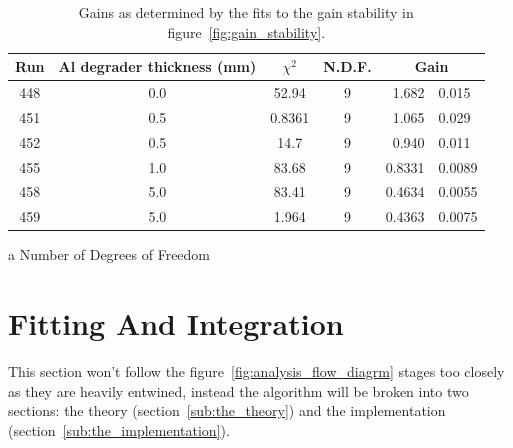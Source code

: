 \begin{table}
    \begin{center}
        \begin{threeparttable}
            \begin{tabular}{c|c|c|c|r@{ $\pm$ }l}
                Run & Al degrader thickness (mm) & $\chi^2$ 
                                                 & N.D.F. \tnote{a}
                                                 & \multicolumn{2}{|c}{Gain} \\
                \hline
                448  &  0.0  &  52.94   &  9  &  1.682  &  0.015  \\
                451  &  0.5  &  0.8361  &  9  &  1.065  &  0.029  \\
                452  &  0.5  &  14.7    &  9  &  0.940  &  0.011  \\
                455  &  1.0  &  83.68   &  9  &  0.8331 &  0.0089 \\
                458  &  5.0  &  83.41   &  9  &  0.4634 &  0.0055 \\
                459  &  5.0  &  1.964   &  9  &  0.4363 &  0.0075 \\
            \end{tabular}
            \caption{Gains as determined by the fits to the gain stability in figure~\ref{fig:gain_stability}.}
            \begin{tablenotes}
                \item [a] Number of Degrees of Freedom
            \end{tablenotes}
            \label{tab:gain_stability_paramters}
        \end{threeparttable}
    \end{center}
\end{table}

\section{Fitting And Integration} %
\label{sec:fitting_and_integration}
This section won't follow the figure~\ref{fig:analysis_flow_diagrm} stages too closely as they are heavily entwined, instead the algorithm will be broken into two sections: the theory (section~\ref{sub:the_theory}) and the implementation (section~\ref{sub:the_implementation}).

